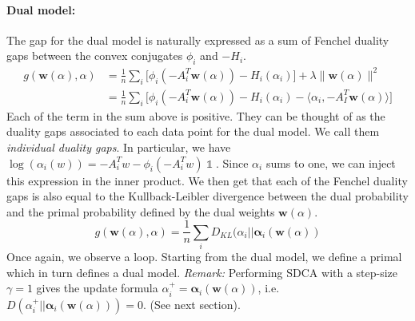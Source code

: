 \documentclass{article}
\DeclareMathOperator{\1}{\mathbb{1}}
\begin{document}
\paragraph{Dual model:}
The gap for the dual model is naturally expressed as a sum of Fenchel duality gaps between the convex conjugates $\phi_i$ and $-H_i$. 
\begin{align*}
	g(\bm w(\alpha),\alpha) 
	& = \frac{1}{n} \sum_i \big [ \phi_i(-A_i^T \bm w(\alpha)) - H_i(\alpha_i) \big ] + \lambda \|\bm w(\alpha)\|^2 \\
	& =  \frac{1}{n} \sum_i \big [ \phi_i(-A_i^T \bm w(\alpha)) - H_i(\alpha_i) - \langle \alpha_i,  -A_I^T \bm w(\alpha) \rangle \big ]
\end{align*}
Each of the term in the sum above is positive.
They can be thought of as the duality gaps associated to each data point for the dual model.
We call them \textit{individual duality gaps}.
In particular, we have $\log(\alpha_i(w)) = -A_i^Tw - \phi_i(-A_i^Tw) \1$. Since $\alpha_i$ sums to one, we can inject this expression in the inner product. We then get that each of the Fenchel duality gaps is also equal to the Kullback-Leibler divergence between the dual probability and the primal probability defined by the dual weights $\bm w(\alpha)$.
\begin{equation}
	\label{dual duality gaps}
	g(\bm w(\alpha),\alpha) = \frac{1}{n} \sum_i D_{KL} (\alpha_i || \bm \alpha_i(\bm w(\alpha))
\end{equation}
Once again, we observe a loop. Starting from the dual model, we define a primal which in turn defines a dual model.
\textit{Remark:} Performing SDCA with a step-size $\gamma=1$ gives the update formula $\alpha_i^+ = \bm \alpha_i(\bm w(\alpha))$, i.e. $ D(\alpha_i^+ || \bm \alpha_i(\bm w(\alpha)) )=0$. (See next section).

\end{document}
